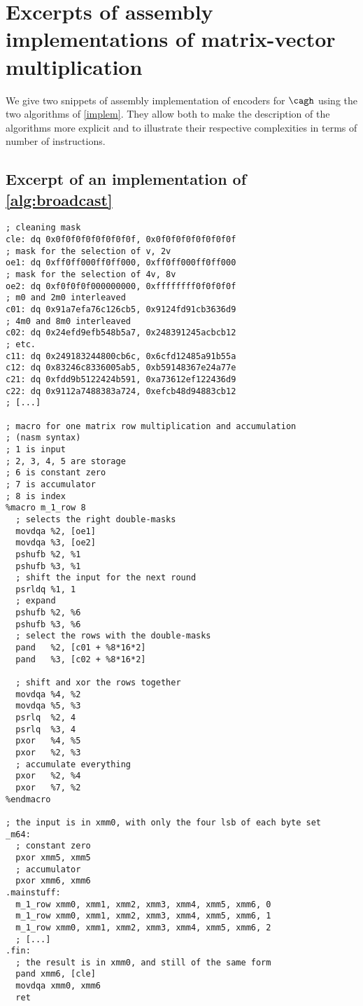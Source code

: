 \FloatBarrier

\section{Excerpts of assembly implementations of matrix-vector multiplication}

We give two snippets of assembly implementation of encoders for $\cagh$
using the two algorithms of \autoref{implem}.
They allow both to make the description of the algorithms more explicit and to
illustrate their respective complexities in terms of number of instructions. 

\subsection{Excerpt of an implementation of \autoref{alg:broadcast}}
\label{app:gene}

\begin{verbatim}
; cleaning mask
cle: dq 0x0f0f0f0f0f0f0f0f, 0x0f0f0f0f0f0f0f0f
; mask for the selection of v, 2v
oe1: dq 0xff0ff000ff0ff000, 0xff0ff000ff0ff000
; mask for the selection of 4v, 8v
oe2: dq 0xf0f0f0f000000000, 0xffffffff0f0f0f0f
; m0 and 2m0 interleaved
c01: dq 0x91a7efa76c126cb5, 0x9124fd91cb3636d9
; 4m0 and 8m0 interleaved
c02: dq 0x24efd9efb548b5a7, 0x248391245acbcb12
; etc.
c11: dq 0x249183244800cb6c, 0x6cfd12485a91b55a
c12: dq 0x83246c8336005ab5, 0xb59148367e24a77e
c21: dq 0xfdd9b5122424b591, 0xa73612ef122436d9
c22: dq 0x9112a7488383a724, 0xefcb48d94883cb12
; [...]

; macro for one matrix row multiplication and accumulation
; (nasm syntax)
; 1 is input
; 2, 3, 4, 5 are storage
; 6 is constant zero
; 7 is accumulator
; 8 is index
%macro m_1_row 8
  ; selects the right double-masks
  movdqa %2, [oe1]
  movdqa %3, [oe2]
  pshufb %2, %1
  pshufb %3, %1
  ; shift the input for the next round
  psrldq %1, 1
  ; expand
  pshufb %2, %6
  pshufb %3, %6
  ; select the rows with the double-masks
  pand   %2, [c01 + %8*16*2]
  pand   %3, [c02 + %8*16*2]

  ; shift and xor the rows together
  movdqa %4, %2
  movdqa %5, %3
  psrlq  %2, 4
  psrlq  %3, 4
  pxor   %4, %5
  pxor   %2, %3
  ; accumulate everything
  pxor   %2, %4
  pxor   %7, %2
%endmacro

; the input is in xmm0, with only the four lsb of each byte set
_m64:
  ; constant zero
  pxor xmm5, xmm5
  ; accumulator
  pxor xmm6, xmm6
.mainstuff:
  m_1_row xmm0, xmm1, xmm2, xmm3, xmm4, xmm5, xmm6, 0
  m_1_row xmm0, xmm1, xmm2, xmm3, xmm4, xmm5, xmm6, 1
  m_1_row xmm0, xmm1, xmm2, xmm3, xmm4, xmm5, xmm6, 2
  ; [...]
.fin:
  ; the result is in xmm0, and still of the same form
  pand xmm6, [cle]
  movdqa xmm0, xmm6
  ret
\end{verbatim}

